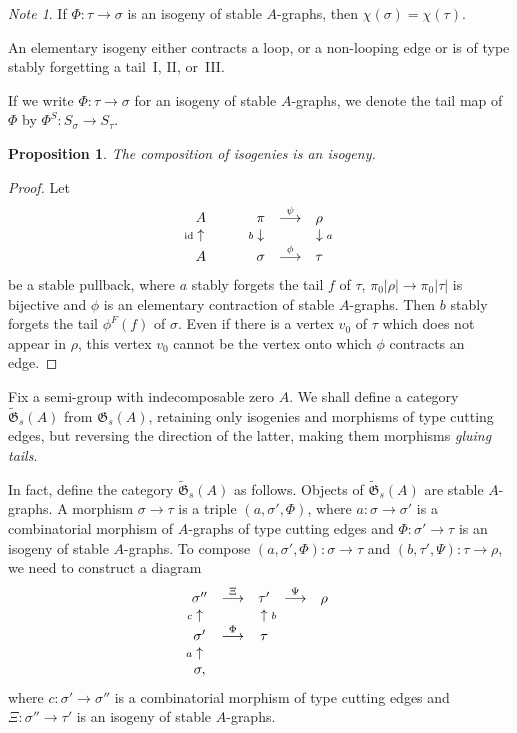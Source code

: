 \documentclass[11pt]{amsart}
\newtheorem{prop}{Proposition}[section]
\theoremstyle{definition}
\theoremstyle{remark}
\newtheorem{note}{Note}\renewcommand{\thenote}{}
\newenvironment{pf}{\begin{proof}}{\end{proof}}
\renewcommand{\tilde}{\widetilde}
\newcommand{\GG}{{\mathfrak{G}}}
\newcommand{\id}{\operatorname{\rm id}}
\newcommand{\ldiag}[1]
       {\makebox[0cm]{\({\scriptstyle#1}\downarrow\phantom{\scriptstyle#1}\)}}
\newcommand{\ldiagup}[1]
       {\makebox[0cm]{\({\scriptstyle#1}\uparrow\phantom{\scriptstyle#1}\)}}
\newcommand{\rdiag}[1]
       {\makebox[0cm]{\(\phantom{\scriptstyle#1}\downarrow{\scriptstyle#1}\)}}
\newcommand{\rdiagup}[1]
       {\makebox[0cm]{\(\phantom{\scriptstyle#1}\uparrow{\scriptstyle#1}\)}}
\renewcommand{\t}{_{\tau}}
\newcommand{\s}{_{\sigma}}
\theoremstyle{plain}
\theoremstyle{definition}
\theoremstyle{remark}
\begin{document}
\begin{note}
If \(\Phi:\tau\rightarrow\sigma\) is an isogeny of stable \(A\)-graphs, then
\(\chi(\sigma)=\chi(\tau)\).

An elementary isogeny either contracts a loop, or a non-looping edge or is of
type stably forgetting a tail~I, II,
or~III.

If we write \(\Phi:\tau\rightarrow\sigma\) for an isogeny of stable \(A\)-graphs,
we denote the tail map of \(\Phi\) by
\(\Phi^S:S\s\rightarrow S\t\).
\end{note}

\begin{prop}
The composition of isogenies is an isogeny.
\end{prop}
\begin{pf}
Let
\[
\begin{array}{ccccc}
A & & \pi & \stackrel{\psi}{\longrightarrow} & \rho \\
\ldiagup{\id} & \phantom{\longrightarrow} & \ldiag{b} &  & \rdiag{a} \\
A & & \sigma & \stackrel{\phi}{\longrightarrow} & \tau
\end{array}
\]
be a stable pullback, where \(a\) stably forgets the tail \(f\) of \(\tau\),
\(\pi_0|\rho|\rightarrow\pi_0|\tau|\) is bijective
and \(\phi\) is an elementary contraction of stable \(A\)-graphs. Then \(b\) stably
forgets the tail \(\phi^F(f)\) of \(\sigma\).
Even if there is a vertex \(v_0\) of \(\tau\) which does not appear in \(\rho\), this
vertex \(v_0\) cannot be the vertex onto
which \(\phi\) contracts an edge.
\end{pf}

Fix a semi-group with indecomposable zero \(A\). We shall define a category
\(\tilde{\GG}_s(A)\) from \(\GG_s(A)\), retaining
only isogenies and morphisms of type cutting edges, but reversing the direction
of the latter, making them morphisms
{\em gluing tails}.

In fact, define the category \(\tilde{\GG}_s(A)\) as follows. Objects of
\(\tilde{\GG}_s(A)\) are stable \(A\)-graphs. A
morphism \(\sigma\rightarrow\tau\) is a triple \((a,\sigma',\Phi)\), where
\(a:\sigma\rightarrow\sigma'\) is a combinatorial
morphism of \(A\)-graphs of type cutting edges and \(\Phi:\sigma'\rightarrow\tau\)
is an isogeny of stable \(A\)-graphs. To
compose \((a,\sigma',\Phi):\sigma\rightarrow\tau\) and
\((b,\tau',\Psi):\tau\rightarrow\rho\), we need to construct a
diagram
\begin{equation}\label{dcmei}
\begin{array}{ccccc}
\sigma'' & \stackrel{\Xi}{\longrightarrow} & \tau' &
\stackrel{\Psi}{\longrightarrow} & \rho \\
\ldiagup{c} & & \rdiagup{b} &  & \\
\sigma' & \stackrel{\Phi}{\longrightarrow} & \tau & & \\
\ldiagup{a} & & & & \\
\sigma, & & & &
\end{array}
\end{equation}
where \(c:\sigma'\rightarrow\sigma''\) is a combinatorial morphism of type
cutting edges and
\(\Xi:\sigma''\rightarrow\tau'\) is an isogeny of stable \(A\)-graphs.
\end{document}

